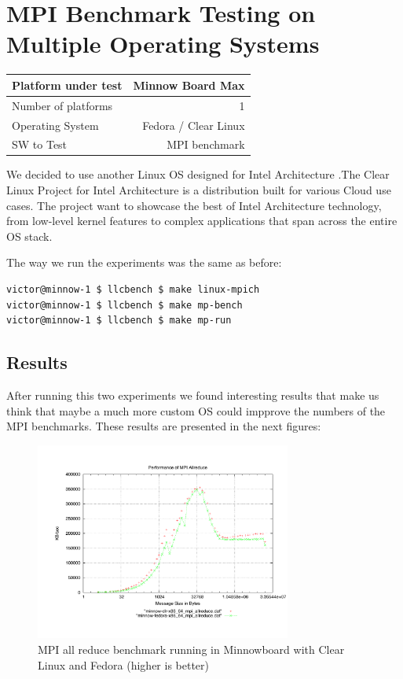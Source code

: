 \section{MPI Benchmark Testing on Multiple Operating Systems}

    \begin{center}
    \begin{tabular}{ | l | r |}
        \hline
        Platform under test & Minnow Board  Max \\ \hline
        Number of platforms  & 1  \\ \hline
        Operating System & Fedora / Clear Linux  \\ \hline
        SW to Test & MPI benchmark \\ \hline
    \end{tabular}
    \end{center}


We decided to use another Linux OS designed for Intel Architecture
\cite{clear-linux}.The Clear Linux Project for Intel Architecture is a
distribution built for various Cloud use cases. The project  want to showcase
the best of Intel Architecture technology, from low-level kernel features to
complex applications that span across the entire OS stack.

The way we run the experiments was the same as before: 

\begin{lstlisting}[frame=single,language=bash]
victor@minnow-1 $ llcbench $ make linux-mpich
victor@minnow-1 $ llcbench $ make mp-bench
victor@minnow-1 $ llcbench $ make mp-run
\end{lstlisting}

\subsection{Results}

After running this two experiments we found interesting results that make us
think that maybe a much more custom OS could impprove the numbers of the MPI
benchmarks. These results are presented in the next figures:

\begin{figure}[H]
\centering
\includegraphics[width=0.75\textwidth]{images/mpbench_clr_experiments/mpi_allreduce.pdf}
\caption{MPI all reduce benchmark running in Minnowboard with Clear Linux and
Fedora (higher is better)}
\label{mpi_allreduce_clr_fedora}
\end{figure}

